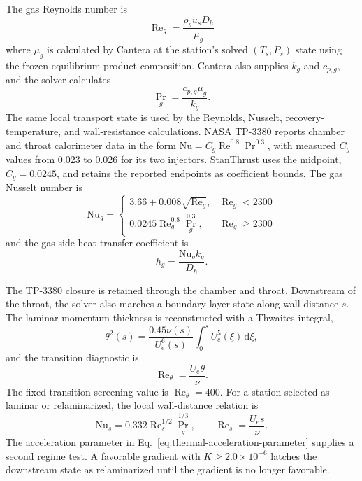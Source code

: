 \documentclass[11pt]{article}
\newcommand{\Rey}{\operatorname{Re}}
\begin{document}
The gas Reynolds number is
\begin{equation}
\Rey_g=\frac{\rho_s u_s D_h}{\mu_g}
\label{eq:gas-reynolds}
\end{equation}
where $\mu_g$ is calculated by Cantera at the station's solved $(T_s,P_s)$ state using the frozen equilibrium-product composition. Cantera also supplies $k_g$ and $c_{p,g}$, and the solver calculates
\begin{equation}
\Pr_g=\frac{c_{p,g}\mu_g}{k_g}.
\label{eq:gas-prandtl}
\end{equation}
The same local transport state is used by the Reynolds, Nusselt, recovery-temperature, and wall-resistance calculations. NASA TP-3380 reports chamber and throat calorimeter data in the form $\mathrm{Nu}=C_g\Rey^{0.8}\Pr^{0.3}$, with measured $C_g$ values from 0.023 to 0.026 for its two injectors. StanThrust uses the midpoint, $C_g=0.0245$, and retains the reported endpoints as coefficient bounds. The gas Nusselt number is
\begin{equation}
\mathrm{Nu}_g=
\begin{cases}
3.66+0.008\sqrt{\Rey_g}, & \Rey_g<2300\\
0.0245\Rey_g^{0.8}\Pr_g^{0.3}, & \Rey_g\ge 2300
\end{cases}
\label{eq:gas-nusselt}
\end{equation}
and the gas-side heat-transfer coefficient is
\begin{equation}
h_g=\frac{\mathrm{Nu}_g k_g}{D_h}.
\label{eq:gas-heat-transfer-coefficient}
\end{equation}

The TP-3380 closure is retained through the chamber and throat. Downstream of the throat, the solver also marches a boundary-layer state along wall distance $s$. The laminar momentum thickness is reconstructed with a Thwaites integral,
\begin{equation}
\theta^2(s)=\frac{0.45\nu(s)}{U_e^6(s)}\int_0^s U_e^5(\xi)\,\mathrm{d}\xi,
\label{eq:thwaites-momentum-thickness}
\end{equation}
and the transition diagnostic is
\begin{equation}
\Rey_\theta=\frac{U_e\theta}{\nu}.
\label{eq:momentum-thickness-reynolds}
\end{equation}
The fixed transition screening value is $\Rey_\theta=400$. For a station selected as laminar or relaminarized, the local wall-distance relation is
\begin{equation}
\mathrm{Nu}_s=0.332\Rey_s^{1/2}\Pr_g^{1/3},
\qquad
\Rey_s=\frac{U_es}{\nu}.
\label{eq:laminar-nozzle-nusselt}
\end{equation}
The acceleration parameter in Eq.~\eqref{eq:thermal-acceleration-parameter} supplies a second regime test. A favorable gradient with $K\ge2.0\times10^{-6}$ latches the downstream state as relaminarized until the gradient is no longer favorable.
\end{document}
